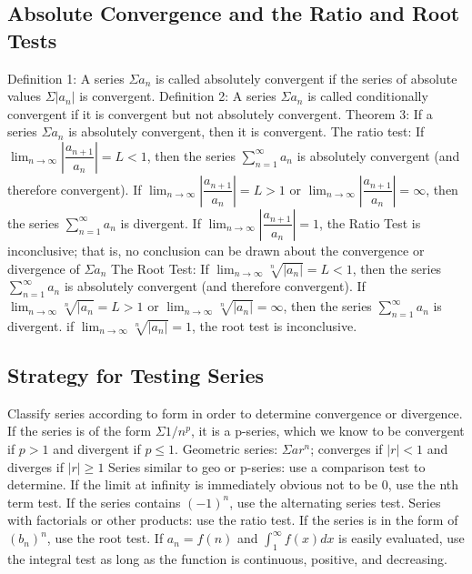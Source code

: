 \documentclass{article}
\begin{document}
    \subsection{Absolute Convergence and the Ratio and Root Tests}
    \begin{outline}
        \1 Definition 1: A series \(\Sigma a_n\) is called absolutely convergent if the series of absolute values \(\Sigma|a_n|\) is convergent. 
        \1 Definition 2: A series \(\Sigma a_n\) is called conditionally convergent if it is convergent but not absolutely convergent. 
        \1 Theorem 3: If a series \(\Sigma a_n\) is absolutely convergent, then it is convergent. 
        \1 The ratio test: 
            \2 If \(\lim_{n\to\infty}\left|\dfrac{a_{n+1}}{a_n}\right|=L<1\), then the series \(\sum^\infty_{n=1}a_n\) is absolutely convergent (and therefore convergent). 
            \2 If \(\lim_{n\to\infty}\left|\dfrac{a_{n+1}}{a_n}\right|=L>1\) or \(\lim_{n\to\infty}\left|\dfrac{a_{n+1}}{a_n}\right|=\infty\), then the series \(\sum^\infty_{n=1}a_n\) is divergent. 
            \2 If \(\lim_{n\to\infty}\left|\dfrac{a_{n+1}}{a_n}\right|=1\), the Ratio Test is inconclusive; that is, no conclusion can be drawn about the convergence or divergence of \(\Sigma a_n\)
        \1 The Root Test: 
            \2 If \(\lim_{n\to\infty}\sqrt[n]{|a_n|}=L<1\), then the series \(\sum^\infty_{n=1}a_n\) is absolutely convergent (and therefore convergent). 
            \2 If \(\lim_{n\to\infty}\sqrt[n]{|a_n}=L>1\) or \(\lim_{n\to\infty}\sqrt[n]{|a_n|}=\infty\), then the series \(\sum^\infty_{n=1}a_n\) is divergent. 
            \2 if \(\lim_{n\to\infty}\sqrt[n]{|a_n|}=1\), the root test is inconclusive. 
    \end{outline}
    \subsection{Strategy for Testing Series}
    \begin{outline}
        \1 Classify series according to form in order to determine convergence or divergence. 
        \1 If the series is of the form \(\Sigma 1/n^p\), it is a p-series, which we know to be convergent if \(p>1\) and divergent if \(p\leq 1\).
        \1 Geometric series: \(\Sigma ar^n\); converges if \(|r|<1\) and diverges if \(|r|\geq 1\)
        \1 Series similar to geo or p-series: use a comparison test to determine. 
        \1 If the limit at infinity is immediately obvious not to be 0, use the nth term test. 
        \1 If the series contains \((-1)^n\), use the alternating series test. 
        \1 Series with factorials or other products: use the ratio test. 
        \1 If the series is in the form of \((b_n)^n\), use the root test. 
        \1 If \(a_n=f(n)\) and \(\int^\infty_1f(x)dx\) is easily evaluated, use the integral test as long as the function is continuous, positive, and decreasing. 

    \end{outline}
\end{document}

